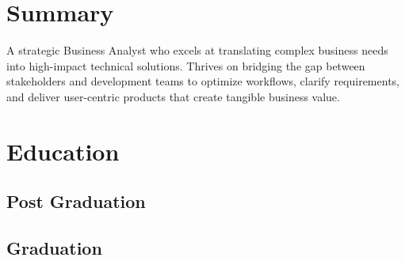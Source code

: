 \documentclass[]{deedy-resume-reversed}
\begin{document}
\begin{minipage}[t]{0.33\textwidth}


\section{Summary}

A strategic Business Analyst who excels at translating complex business needs into high-impact technical solutions. Thrives on bridging the gap between stakeholders and development teams to optimize workflows, clarify requirements, and deliver user-centric products that create tangible business value.

\sectionsep

\section{Education}

\subsection{Post Graduation}
\sectionsep


\subsection{Graduation}
\sectionsep



\end{minipage}
\end{document}
